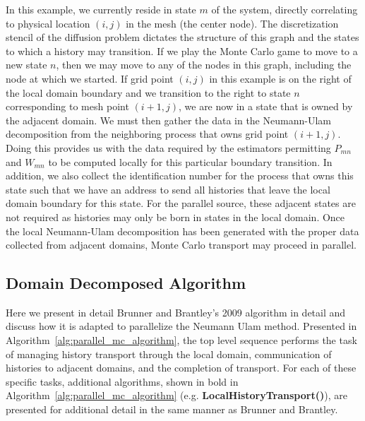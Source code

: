 In this example, we currently reside in state $m$ of the system,
directly correlating to physical location $(i,j)$ in the mesh (the
center node). The discretization stencil of the diffusion problem
dictates the structure of this graph and the states to which a history
may transition. If we play the Monte Carlo game to move to a new state
$n$, then we may move to any of the nodes in this graph, including the
node at which we started. If grid point $(i,j)$ in this example is on
the right of the local domain boundary and we transition to the right
to state $n$ corresponding to mesh point $(i+1,j)$, we are now in a
state that is owned by the adjacent domain. We must then gather the
data in the Neumann-Ulam decomposition from the neighboring process
that owns grid point $(i+1,j)$. Doing this provides us with the data
required by the estimators permitting $P_{mn}$ and $W_{mn}$ to be
computed locally for this particular boundary transition. In addition,
we also collect the identification number for the process that owns
this state such that we have an address to send all histories that
leave the local domain boundary for this state. For the parallel
source, these adjacent states are not required as histories may only
be born in states in the local domain. Once the local Neumann-Ulam
decomposition has been generated with the proper data collected from
adjacent domains, Monte Carlo transport may proceed in parallel.

\clearpage

\subsection{Domain Decomposed Algorithm}
\label{subsec:parallel_mc_algorithm}

Here we present in detail Brunner and Brantley's 2009 algorithm in
detail and discuss how it is adapted to parallelize the Neumann Ulam
method. Presented in Algorithm~\ref{alg:parallel_mc_algorithm}, the
top level sequence performs the task of managing history transport
through the local domain, communication of histories to adjacent
domains, and the completion of transport. For each of these specific
tasks, additional algorithms, shown in bold in
Algorithm~\ref{alg:parallel_mc_algorithm}
(e.g. \textbf{LocalHistoryTransport()}), are presented for additional
detail in the same manner as Brunner and Brantley.

